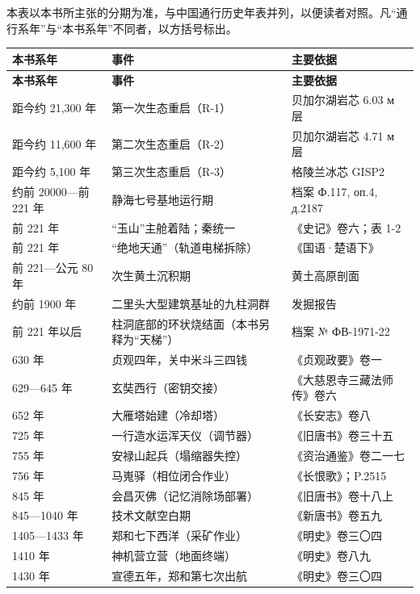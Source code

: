 本表以本书所主张的分期为准，与中国通行历史年表并列，以便读者对照。凡“通行系年”与“本书系年”不同者，以方括号标出。

\vspace{2mm}
{\footnotesize
\renewcommand{\arraystretch}{1.22}
\begin{longtable}{@{}p{31mm}p{55mm}p{45mm}@{}}
\toprule
\textbf{本书系年} & \textbf{事件} & \textbf{主要依据}\\
\midrule
\endfirsthead
\toprule
\textbf{本书系年} & \textbf{事件} & \textbf{主要依据}\\
\midrule
\endhead
\bottomrule
\endfoot
距今约 21{,}300 年 & 第一次生态重启（R-1） & 贝加尔湖岩芯 6.03 м 层\\
距今约 11{,}600 年 & 第二次生态重启（R-2） & 贝加尔湖岩芯 4.71 м 层\\
距今约 5{,}100 年 & 第三次生态重启（R-3） & 格陵兰冰芯 GISP2\\
约前 20000—前 221 年 & 静海七号基地运行期 & 档案 Ф.117, оп.4, д.2187\\
前 221 年 & “玉山”主舱着陆；秦统一 & 《史记》卷六；表 1-2\\
前 221 年 & “绝地天通”（轨道电梯拆除） & 《国语·楚语下》\\
前 221—公元 80 年 & 次生黄土沉积期 & 黄土高原剖面\\
约前 1900 年 & 二里头大型建筑基址的九柱洞群 & 发掘报告\\
前 221 年以后 & 柱洞底部的环状烧结面（本书另释为“天梯”） & 档案 № ФВ-1971-22\\
630 年 & 贞观四年，关中米斗三四钱 & 《贞观政要》卷一\\
629—645 年 & 玄奘西行（密钥交接） & 《大慈恩寺三藏法师传》卷六\\
652 年 & 大雁塔始建（冷却塔） & 《长安志》卷八\\
725 年 & 一行造水运浑天仪（调节器） & 《旧唐书》卷三十五\\
755 年 & 安禄山起兵（塌缩器失控） & 《资治通鉴》卷二一七\\
756 年 & 马嵬驿（相位闭合作业） & 《长恨歌》；P.2515\\
845 年 & 会昌灭佛（记忆消除场部署） & 《旧唐书》卷十八上\\
845—1040 年 & 技术文献空白期 & 《新唐书》卷五九\\
1405—1433 年 & 郑和七下西洋（采矿作业） & 《明史》卷三〇四\\
1410 年 & 神机营立营（地面终端） & 《明史》卷八九\\
1430 年 & 宣德五年，郑和第七次出航 & 《明史》卷三〇四\\

\end{longtable}}
